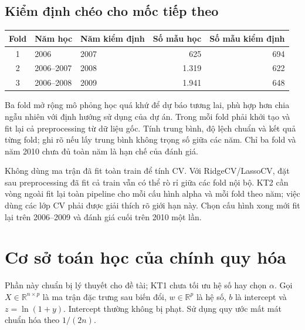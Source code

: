 \documentclass[12pt,a4paper]{article}
\newcommand{\R}{\mathbb{R}}
\begin{document}
\subsection{Kiểm định chéo cho mốc tiếp theo}

\begingroup\small\setlength{\tabcolsep}{5pt}
\begin{tabularx}{\linewidth}{@{}cYYrr@{}}\toprule

\textbf{Fold} & \textbf{Năm học} & \textbf{Năm kiểm định} & \textbf{Số mẫu học} & \textbf{Số mẫu kiểm định}\\

\midrule

1 & 2006 & 2007 & 625 & 694\\

2 & 2006–2007 & 2008 & 1.319 & 622\\

3 & 2006–2008 & 2009 & 1.941 & 648\\

\bottomrule\end{tabularx}\endgroup\par

Ba fold mở rộng mô phỏng học quá khứ để dự báo tương lai, phù hợp hơn chia ngẫu nhiên với định hướng sử dụng của dự án. Trong mỗi fold phải khởi tạo và fit lại cả preprocessing từ dữ liệu gốc. Tính trung bình, độ lệch chuẩn và kết quả từng fold; ghi rõ nếu lấy trung bình không trọng số giữa các năm. Chỉ ba fold và năm 2010 chưa đủ toàn năm là hạn chế của đánh giá.


Không dùng ma trận  đã fit toàn train để tính CV. Với RidgeCV/LassoCV, đặt sau preprocessing đã fit cả train vẫn có thể rò rỉ giữa các fold nội bộ. KT2 cần vòng ngoài fit lại toàn pipeline cho mỗi cấu hình alpha và mỗi fold theo năm; việc dùng các lớp CV phải được giải thích rõ giới hạn này. Chọn cấu hình xong mới fit lại trên 2006–2009 và đánh giá cuối trên 2010 một lần.


\clearpage

\section{Cơ sở toán học của chính quy hóa}

Phần này chuẩn bị lý thuyết cho đề tài; KT1 chưa tối ưu hệ số hay chọn
$\alpha$. Gọi $X\in\R^{n\times p}$ là ma trận đặc trưng sau biến đổi,
$w\in\R^p$ là hệ số, $b$ là intercept và $z=\ln(1+y)$.
Intercept thường không bị phạt. Sử dụng quy ước mất mát chuẩn hóa theo $1/(2n)$.
\end{document}
